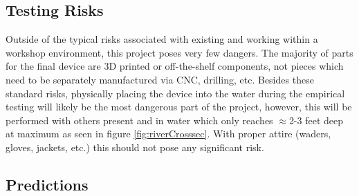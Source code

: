 \documentclass[fleqn,10pt]{SelfArx} %
\begin{document}
	\subsection{Testing Risks}
	Outside of the typical risks associated with existing and working within a workshop environment, this project poses very few dangers. The majority of parts for the final device are 3D printed or off-the-shelf components, not pieces which need to be separately manufactured via CNC, drilling, etc. Besides these standard risks, physically placing the device into the water during the empirical testing will likely be the most dangerous part of the project, however, this will be performed with others present and in water which only reaches $\approx$2-3 feet deep at maximum as seen in figure \ref{fig:riverCrosssec}. With proper attire (waders, gloves, jackets, etc.) this should not pose any significant risk.
	\subsection{Predictions}
	\label{subsubsec:predictions}
\end{document}
